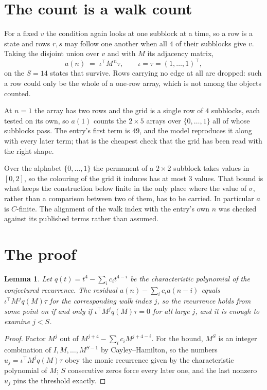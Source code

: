 \documentclass[11pt,a4paper]{article}
\theoremstyle{plain}
\newtheorem{lemma}[theorem]{Lemma}
\theoremstyle{definition}
\begin{document}
\section{The count is a walk count}

For a fixed $v$ the condition again looks at one subblock at a time, so a
row is a state and rows $r,s$ may follow one another when all $4$ of their subblocks give
$v$. Taking the disjoint union over $v$ and with $M$ its adjacency matrix,
\[
a(n)\;=\;\iota^{\!\top}M^{\,n}\tau,\qquad\iota=\tau=(1,\dots,1)^{\!\top},
\]
on the $S=14$ states that survive. Rows carrying no edge at all are dropped: such a row could
only be the whole of a one-row array, which is not among the objects counted.

At $n=1$ the array has two rows and the grid is a single row of $4$
subblocks, each tested on its own, so $a(1)$ counts the
$2\times5$ arrays over $\{0,\dots,1\}$ all of whose subblocks pass. The entry's
first term is $49$, and the model reproduces it along with every later term; that is the
cheapest check that the grid has been read with the right shape.

Over the alphabet $\{0,\dots,1\}$ the permanent of a $2\times2$ subblock takes values in
$[0,2]$, so the colouring of the grid it induces has at most $3$ values.
That bound is what keeps the construction below finite in the only place where the value of
$\sigma$, rather than a comparison between two of them, has to be carried.
In particular $a$ is $C$-finite. The alignment of the walk index with the entry's own $n$ was
checked against its published terms rather than assumed.

\section{The proof}

\begin{lemma}\label{lem:crit}
Let $q(t)=t^{4}-\sum_i c_it^{4-i}$ be the characteristic polynomial of the
conjectured recurrence. The residual $a(n)-\sum_ic_ia(n-i)$ equals
$\iota^{\!\top}M^{\,j}q(M)\tau$ for the corresponding walk index $j$, so the recurrence
holds from some point on if and only if $\iota^{\!\top}M^{j}q(M)\tau=0$ for all large $j$,
and it is enough to examine $j<S$.
\end{lemma}

\begin{proof}
Factor $M^{j}$ out of $M^{j+4}-\sum_ic_iM^{j+4-i}$. For the bound, $M^{S}$
is an integer combination of $I,M,\dots,M^{S-1}$ by Cayley--Hamilton, so the numbers
$u_j=\iota^{\!\top}M^{j}q(M)\tau$ obey the monic recurrence given by the characteristic
polynomial of $M$; $S$ consecutive zeros force every later one, and the last nonzero $u_j$
pins the threshold exactly.
\end{proof}
\end{document}
